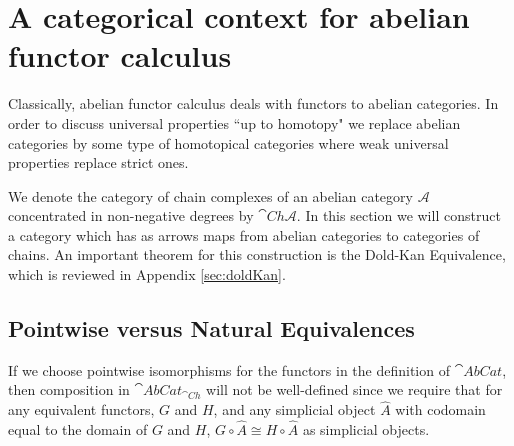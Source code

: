 \section{A categorical context for abelian functor calculus}


Classically, abelian functor calculus deals with functors to abelian categories. In order to discuss universal properties ``up to homotopy" we replace abelian categories by some type of homotopical categories where weak universal properties replace strict ones. 


We denote the category of chain complexes of an abelian category $\mathcal{A}$ concentrated in non-negative degrees by $\cat{Ch}\mathcal{A}$. In this section we will construct a category which has as arrows maps from abelian categories to categories of chains. An important theorem for this construction is the Dold-Kan Equivalence, which is reviewed in Appendix \ref{sec:doldKan}.



\subsection{Pointwise versus Natural Equivalences}\label{sec:ptwiseNat}

\begin{rmk}
    If we choose pointwise isomorphisms for the functors in the definition of $\cat{AbCat}$, then composition in $\cat{AbCat}_{\cat{Ch}}$ will not be well-defined since we require that for any equivalent functors, $G$ and $H$, and any simplicial object $\hat{A}$ with codomain equal to the domain of $G$ and $H$, $G\circ \hat{A}\cong H\circ \hat{A}$ as simplicial objects.
\end{rmk}


